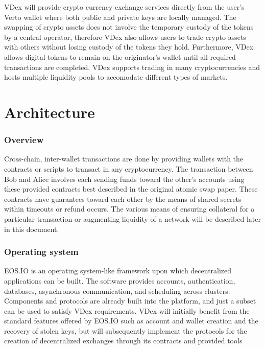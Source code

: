 \documentclass[]{article}
\begin{document}
VDex will provide crypto currency exchange services directly from the user's Verto wallet where both public and private keys are locally managed.
The swapping of crypto assets does not involve the temporary custody of the tokens by a central operator, 
therefore VDex also allows users to trade crypto assets with others without losing custody of the tokens they hold. 
Furthermore, VDex allows digital tokens to remain on the originator's wallet until all required transactions are completed. 
VDex supports trading in many cryptocurrencies and hosts multiple liquidity pools to accomodate different types of markets.


									
\section{Architecture}
	
	\subsubsection{Overview}
	Cross-chain, inter-wallet transactions are done by providing wallets with the contracts or scripts to transact in any cryptocurrency. 
	The transaction between Bob and Alice involves each sending funds toward the other's accounts 
	using these provided contracts best described in the original atomic swap paper.\cite{22} 
	These contracts have guarantees toward each other by the means of shared secrets within timeouts or refund occurs. 
	The various means of ensuring collateral for a particular transaction or augmenting liquidity of a network 
	will be described later in this document.
  
	\subsubsection{Operating system}
	EOS.IO is an operating system-like framework upon which decentralized applications can be built. 
	The software provides accounts, authentication, databases, asynchronous communication, and scheduling across clusters. 
	Components and protocols are already built into the platform, and just a subset can be used to satisfy VDex requirements. 
	VDex will initially benefit from the standard features offered by EOS.IO such as account and wallet creation 
	and the recovery of stolen keys, but will subsequently implement the protocols 
	for the creation of decentralized exchanges through its contracts and provided tools	\cite{3}\\
  
\end{document}
